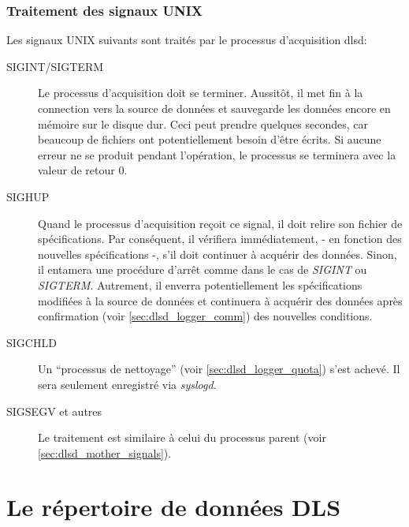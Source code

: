 \documentclass[a4paper,12pt,BCOR6mm,bibtotoc,idxtotoc]{scrbook}
\begin{document}

\subsection{Traitement des signaux UNIX}
\label{sec:dlsd_logger_signals}

Les signaux UNIX suivants sont trait\'es par
le processus d'acquisition dlsd:

\begin{description}

\item[SIGINT/SIGTERM]
  Le processus d'acquisition doit se terminer. Aussit\^ot, il met fin
  \`a la connection vers la source de donn\'ees et sauvegarde les
  donn\'ees encore en m\'emoire sur le disque dur. Ceci peut prendre
  quelques secondes, car beaucoup de fichiers ont potentiellement
  besoin d'\^etre \'ecrits.  Si aucune erreur ne se produit pendant
  l'op\'eration, le processus se terminera avec la valeur de retour 0.

\item[SIGHUP]
  Quand le processus d'acquisition re\c coit ce signal, il doit relire
  son fichier de sp\'ecifications. Par cons\'equent, il v\'erifiera
  imm\'ediatement, - en fonction des nouvelles sp\'ecifications -, s'il
  doit continuer \`a acqu\'erir des donn\'ees. Sinon, il entamera une
  proc\'edure d'arr\^et comme dans le cas de \textit{SIGINT} ou
  \textit{SIGTERM}.  Autrement, il enverra potentiellement les
  sp\'ecifications modifi\'ees \`a la source de donn\'ees et
  continuera \`a acqu\'erir des donn\'ees apr\`es confirmation (voir
  \autoref{sec:dlsd_logger_comm}) des nouvelles conditions.

\item[SIGCHLD]
  Un ``processus de nettoyage'' (voir
  \autoref{sec:dlsd_logger_quota}) s'est achev\'e. Il sera seulement
  enregistr\'e via \textit{syslogd}.

\item[SIGSEGV et autres]
  Le traitement est similaire \`a celui du processus parent (voir
\autoref{sec:dlsd_mother_signals}).

\end{description}


\chapter{Le r\'epertoire de donn\'ees DLS}
\label{sec:data}
\end{document}
